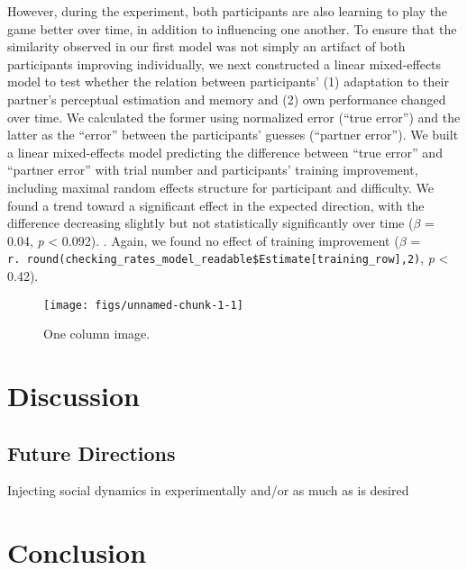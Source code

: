 \documentclass[10pt, letterpaper]{article}
\newenvironment{CodeChunk}{}{}
\begin{document}
However, during the experiment, both participants are also learning to
play the game better over time, in addition to influencing one another.
To ensure that the similarity observed in our first model was not simply
an artifact of both participants improving individually, we next
constructed a linear mixed-effects model to test whether the relation
between participants' (1) adaptation to their partner's perceptual
estimation and memory and (2) own performance changed over time. We
calculated the former using normalized error (``true error'') and the
latter as the ``error'' between the participants' guesses (``partner
error''). We built a linear mixed-effects model predicting the
difference between ``true error'' and ``partner error'' with trial
number and participants' training improvement, including maximal random
effects structure for participant and difficulty. We found a trend
toward a significant effect in the expected direction, with the
difference decreasing slightly but not statistically significantly over
time (\emph{\(\beta\)} = 0.04, \emph{p} \textless{} 0.092). . Again, we
found no effect of training improvement (\emph{\(\beta\)} =
\texttt{r.\ round(checking\_rates\_model\_readable\$Estimate{[}training\_row{]},2)},
\emph{p} \textless{} 0.42).

\begin{CodeChunk}
\begin{figure}[H]

\texttt{[image: figs/unnamed-chunk-1-1]} \hfill{}

\caption[One column image]{One column image.}\label{fig:unnamed-chunk-1}
\end{figure}
\end{CodeChunk}

\section{Discussion}\label{discussion}

\subsection{Future Directions}\label{future-directions}

Injecting social dynamics in experimentally and/or as much as is desired

\section{Conclusion}\label{conclusion}
\end{document}
